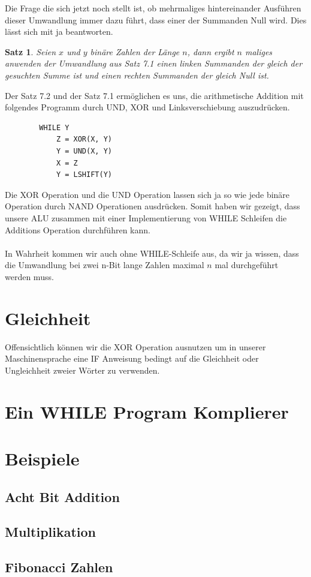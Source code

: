 \documentclass[11pt,a4paper,leqno]{report}
\newtheorem{proposition}{Satz}[chapter]
\numberwithin{equation}{chapter}
\begin{document}
\noindent
Die Frage die sich jetzt noch stellt ist, ob mehrmaliges hintereinander Ausf\"uhren dieser Umwandlung immer dazu f\"uhrt, dass einer der Summanden Null wird. Dies l\"asst sich mit ja beantworten.
\begin{proposition}
	Seien $x$ und $y$ bin\"are Zahlen der L\"ange $n$, dann ergibt $n$ maliges anwenden der Umwandlung aus Satz 7.1 einen linken Summanden der gleich der gesuchten Summe ist und einen rechten Summanden der gleich Null ist.
\end{proposition}
\noindent
Der Satz 7.2 und der Satz 7.1 erm\"oglichen es uns, die arithmetische Addition mit folgendes Programm durch UND, XOR und Linksverschiebung auszudr\"ucken.
\begin{lstlisting}
		WHILE Y
			Z = XOR(X, Y)
			Y = UND(X, Y)
			X = Z
			Y = LSHIFT(Y)
\end{lstlisting}
Die XOR Operation und die UND Operation lassen sich ja so wie jede bin\"are Operation durch NAND Operationen ausdr\"ucken. Somit haben wir gezeigt, dass unsere ALU zusammen mit einer Implementierung von WHILE Schleifen die Additions Operation durchf\"uhren kann.\\
\\
In Wahrheit kommen wir auch ohne WHILE-Schleife aus, da wir ja wissen, dass die Umwandlung bei zwei n-Bit lange Zahlen maximal $n$ mal durchgef\"uhrt werden muss.
\section{Gleichheit}
Offensichtlich k\"onnen wir die XOR Operation ausnutzen um in unserer Maschinensprache eine IF Anweisung bedingt auf die Gleichheit oder Ungleichheit zweier W\"orter zu verwenden.
\section{Ein WHILE Program Komplierer}
\section{Beispiele}
\subsection{Acht Bit Addition}
\subsection{Multiplikation}
\subsection{Fibonacci Zahlen}
\end{document}
